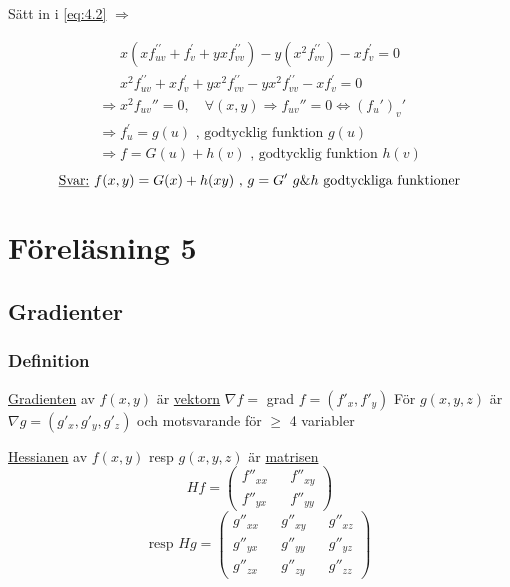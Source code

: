 \documentclass{article}
\begin{document}
Sätt in i \eqref{eq:4.2} \(\Rightarrow\)

\[
\begin{split}
	x(xf_{uv}^{\prime\prime}+f_{v}^{\prime}+yxf_{vv}^{\prime\prime}) - y(x^2f_{vv}^{\prime\prime}) - xf_{v}^{\prime} = 0 \\
	x^2 f_{uv}^{\prime\prime}+xf_{v}^{\prime}+yx^2f_{vv}^{\prime\prime} - yx^2f_{vv}^{\prime\prime} - xf_{v}^{\prime} = 0
\end{split}
\]
\[
\begin{split}
	\Rightarrow x^2f_{uv}'' = 0, \quad \forall (x,y) 
	\Rightarrow f_{uv}'' = 0 \iff (f_{u}')_{v}' \\
	\Rightarrow f_{u}^{\prime} = g(u) \text{ , godtycklig funktion }g(u) \\
	\Rightarrow f = G(u) + h(v) \text{ , godtycklig funktion }h(v)
\end{split}
\]
\[
	\text{\underline{Svar:} } f(x,y) = G(x) + h(xy) \text{ , }g=G^{\prime}\text{  }g\text{\&}h\text{ godtyckliga funktioner}
\]







\newpage
\section{Föreläsning 5}

\subsection{Gradienter}

\subsubsection{Definition}

\underline{Gradienten} av \(f(x,y)\) är \underline{vektorn} \(\nabla f =\) grad \(f = (f'_{x},f'_{y})\) \newline
För \(g(x,y,z)\) är \(\nabla g = (g'_{x},g'_{y},g'_{z})\) och motsvarande för \(\geq\) 4 variabler \newline

\underline{Hessianen} av \(f(x,y)\) resp \(g(x,y,z)\) är \underline{matrisen} 
\[Hf=
\begin{pmatrix}
f''_{xx} && f''_{xy} \\
f''_{yx} && f''_{yy}
\end{pmatrix}\] 
\[\text{resp } Hg = 
\begin{pmatrix}
g''_{xx} && g''_{xy} && g''_{xz} \\
g''_{yx} && g''_{yy} && g''_{yz} \\
g''_{zx} && g''_{zy} && g''_{zz}
\end{pmatrix}\]
\end{document}
